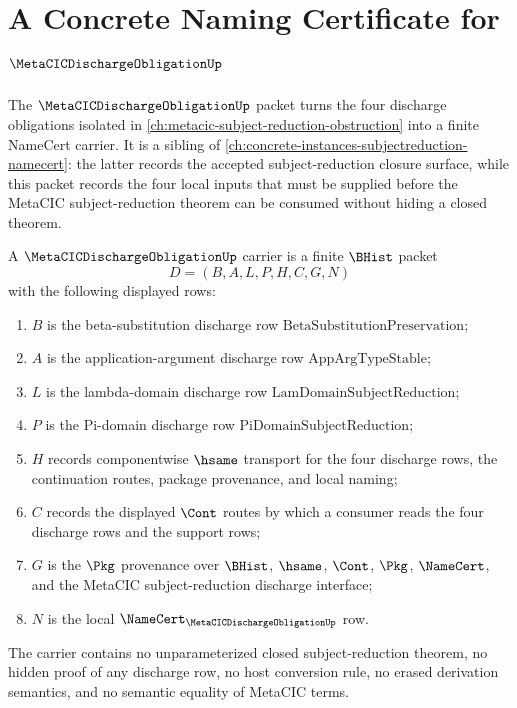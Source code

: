 \chapter{A Concrete Naming Certificate for $\MetaCICDischargeObligationUp$}
\label{ch:concrete-instances-metacic-discharge-obligation-namecert}

The $\MetaCICDischargeObligationUp$ packet turns the four discharge obligations isolated in \autoref{ch:metacic-subject-reduction-obstruction} into a finite NameCert carrier. It is a sibling of \autoref{ch:concrete-instances-subjectreduction-namecert}: the latter records the accepted subject-reduction closure surface, while this packet records the four local inputs that must be supplied before the MetaCIC subject-reduction theorem can be consumed without hiding a closed theorem.

\begin{definition}
\label{def:metacic-discharge-obligation-carrier}
A $\MetaCICDischargeObligationUp$ carrier is a finite $\BHist$ packet
$$
D=(B,A,L,P,H,C,G,N)
$$
with the following displayed rows:
\begin{enumerate}
\item $B$ is the beta-substitution discharge row $\mathrm{BetaSubstitutionPreservation}$;
\item $A$ is the application-argument discharge row $\mathrm{AppArgTypeStable}$;
\item $L$ is the lambda-domain discharge row $\mathrm{LamDomainSubjectReduction}$;
\item $P$ is the Pi-domain discharge row $\mathrm{PiDomainSubjectReduction}$;
\item $H$ records componentwise $\hsame$ transport for the four discharge rows, the continuation routes, package provenance, and local naming;
\item $C$ records the displayed $\Cont$ routes by which a consumer reads the four discharge rows and the support rows;
\item $G$ is the $\Pkg$ provenance over $\BHist$, $\hsame$, $\Cont$, $\Pkg$, $\NameCert$, and the MetaCIC subject-reduction discharge interface;
\item $N$ is the local $\NameCert_{\MetaCICDischargeObligationUp}$ row.
\end{enumerate}
The carrier contains no unparameterized closed subject-reduction theorem, no hidden proof of any discharge row, no host conversion rule, no erased derivation semantics, and no semantic equality of MetaCIC terms.
\end{definition}

